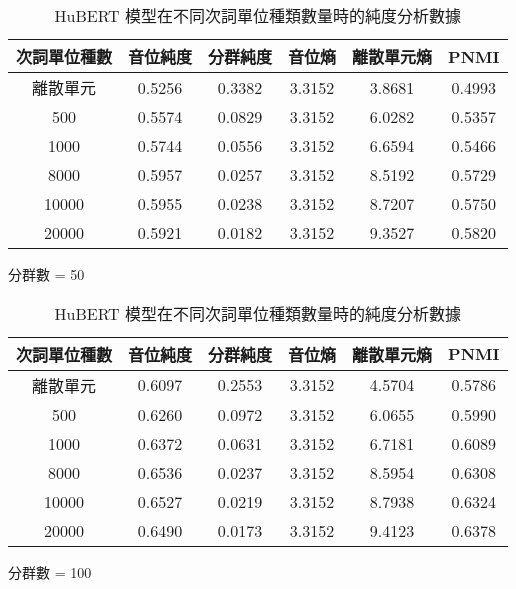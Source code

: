 
{
\begin{table}[!htbp]
    \centering
    \begin{subtable}[t]{\textwidth}
        \centering
        \begin{tabular}{|c|c|c|c|c|c|} \hline 
                次詞單位種數& 音位純度 & 分群純度 & 音位熵 & 離散單元熵 &    PNMI \\ \hline 
離散單元& 0.5256& 0.3382& 3.3152& 3.8681& 0.4993\\ \hline 
                   500  &   0.5574   &  0.0829 &   3.3152  &  6.0282 & 0.5357 \\ \hline %
                  1000  &   0.5744   &  0.0556 &   3.3152  &  6.6594 & 0.5466 \\ \hline %
                  8000  &   0.5957   &  0.0257 &   3.3152  &  8.5192 & 0.5729 \\ \hline %
                 10000  &   0.5955   &  0.0238 &   3.3152  &  8.7207 & 0.5750 \\ \hline %
                 20000  &   0.5921   &  0.0182 &   3.3152  &  9.3527 & 0.5820 \\ \hline %
        \end{tabular}
\caption{分群數 = 50}
        \label{tab:ch4-hubert-phn-clu050-}
    \end{subtable}        
    \jefftablesep        
    \begin{subtable}[t]{\textwidth}
        \centering
        \begin{tabular}{|c|c|c|c|c|c|} \hline 
                次詞單位種數& 音位純度 & 分群純度 & 音位熵 & 離散單元熵 &    PNMI \\ \hline 
離散單元& 0.6097& 0.2553& 3.3152& 4.5704& 0.5786\\ \hline 
                   500  &   0.6260   &  0.0972 &   3.3152  &  6.0655 & 0.5990 \\ \hline %
                  1000  &   0.6372   &  0.0631 &   3.3152  &  6.7181 & 0.6089 \\ \hline %
                  8000  &   0.6536   &  0.0237 &   3.3152  &  8.5954 & 0.6308 \\ \hline %
                 10000  &   0.6527   &  0.0219 &   3.3152  &  8.7938 & 0.6324 \\ \hline %
                 20000  &   0.6490   &  0.0173 &   3.3152  &  9.4123 & 0.6378 \\ \hline %
        \end{tabular}
\caption{分群數 = 100}
        \label{tab:ch4-hubert-phn-clu100-}
    \end{subtable}        


\caption{HuBERT 模型在不同次詞單位種類數量時的純度分析數據}
    \label{tab:hubert-phn-results-}
\end{table}

}  %
